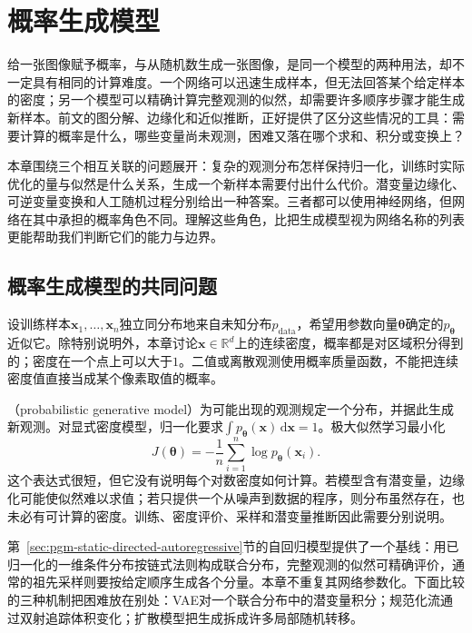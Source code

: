 \chapter{概率生成模型}
\label{chap:pgm-generative}

给一张图像赋予概率，与从随机数生成一张图像，是同一个模型的两种用法，却不一定具有相同的计算难度。一个网络可以迅速生成样本，但无法回答某个给定样本的密度；另一个模型可以精确计算完整观测的似然，却需要许多顺序步骤才能生成新样本。前文的图分解、边缘化和近似推断，正好提供了区分这些情况的工具：需要计算的概率是什么，哪些变量尚未观测，困难又落在哪个求和、积分或变换上？

本章围绕三个相互关联的问题展开：复杂的观测分布怎样保持归一化，训练时实际优化的量与似然是什么关系，生成一个新样本需要付出什么代价。潜变量边缘化、可逆变量变换和人工随机过程分别给出一种答案。三者都可以使用神经网络，但网络在其中承担的概率角色不同。理解这些角色，比把生成模型视为网络名称的列表更能帮助我们判断它们的能力与边界。

\section{概率生成模型的共同问题}
\label{sec:pgm-generative-common}

设训练样本$\bm{x}_1,\ldots,\bm{x}_n$独立同分布地来自未知分布$p_{\mathrm{data}}$，希望用参数向量$\bm{\theta}$确定的$p_{\bm{\theta}}$近似它。除特别说明外，本章讨论$\bm{x}\in\mathbb{R}^{d}$上的连续密度，概率都是对区域积分得到的；密度在一个点上可以大于$1$。二值或离散观测使用概率质量函数，不能把连续密度值直接当成某个像素取值的概率。

（probabilistic generative model）为可能出现的观测规定一个分布，并据此生成新观测。对显式密度模型，归一化要求$\int p_{\bm{\theta}}(\bm{x})\,\mathrm{d}\bm{x}=1$。极大似然学习最小化
\begin{equation}
  \label{eq:pgm-generative-nll}
  J(\bm{\theta})
  =-\frac{1}{n}\sum_{i=1}^{n}\log p_{\bm{\theta}}(\bm{x}_i).
\end{equation}
这个表达式很短，但它没有说明每个对数密度如何计算。若模型含有潜变量，边缘化可能使似然难以求值；若只提供一个从噪声到数据的程序，则分布虽然存在，也未必有可计算的密度。训练、密度评价、采样和潜变量推断因此需要分别说明。

第~\ref{sec:pgm-static-directed-autoregressive}节的自回归模型提供了一个基线：用已归一化的一维条件分布按链式法则构成联合分布，完整观测的似然可精确评价，通常的祖先采样则要按给定顺序生成各个分量。本章不重复其网络参数化。下面比较的三种机制把困难放在别处：VAE对一个联合分布中的潜变量积分；规范化流通过双射追踪体积变化；扩散模型把生成拆成许多局部随机转移。

